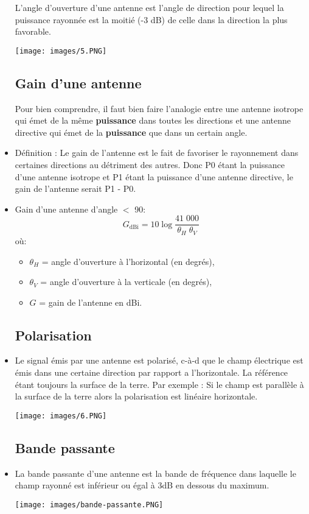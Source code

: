 \documentclass[a4paper]{article}
\begin{document}
\begin{itemize}
L'angle d'ouverture d'une antenne est l'angle de direction pour lequel la puissance rayonnée est la moitié (-3 dB) de celle dans la direction la plus favorable.

\begin{center}
    \texttt{[image: images/5.PNG]}
\end{center}

\subsection{Gain d'une antenne}
Pour bien comprendre, il faut bien faire l'analogie entre une antenne isotrope qui émet de la même \textbf{puissance} dans toutes les directions
et une antenne directive qui émet de la \textbf{puissance} que dans un certain angle.
\item Définition : Le gain de l'antenne est le fait de favoriser le rayonnement dans certaines directions au détriment des autres. Donc P0 étant la puissance d'une antenne isotrope et P1 étant la puissance d'une antenne
directive, le gain de l'antenne serait P1 - P0.
\item Gain d'une antenne d'angle $ < $ 90\textdegree:
\[ G_{\text{dBi}} = 10 \log \frac{41 \; 000}{\theta_H \; \theta_V} \]
où:
\begin{itemize}
    \item $ \theta_H $ = angle d'ouverture à l'horizontal (en degrés),
    \item $ \theta_V $ = angle d'ouverture à la verticale (en degrés),
    \item $ G $ = gain de l'antenne en dBi.
\end{itemize}

\subsection{Polarisation}

\item Le signal émis par une antenne est polarisé, c-à-d que le champ électrique est émis dans une certaine direction par rapport a l'horizontale. La référence étant toujours
la surface de la terre. Par exemple : Si le champ est parallèle à la surface de la terre alors la polarisation est linéaire horizontale.

\begin{center}
    \texttt{[image: images/6.PNG]}
\end{center}

\subsection{Bande passante}

\item La bande passante d'une antenne est la bande de fréquence dans laquelle le champ rayonné est inférieur ou égal à 3dB en dessous du maximum.
\begin{center}
    \texttt{[image: images/bande-passante.PNG]}
\end{center}


\end{itemize}
\end{document}
